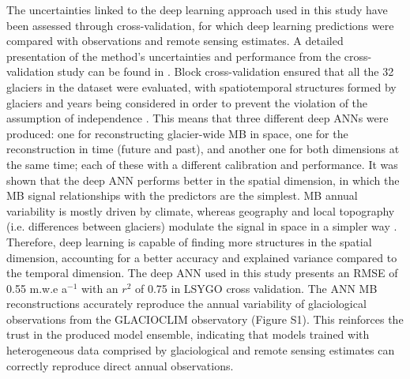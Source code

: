 {The uncertainties linked to the deep learning approach used in this study have been assessed through cross-validation, for which deep learning predictions were compared with observations and remote sensing estimates. A detailed presentation of the method's uncertainties and performance from the cross-validation study can be found in \citet{bolibar_deep_2020-1}. Block cross-validation ensured that all the 32 glaciers in the dataset were evaluated, with spatiotemporal structures formed by glaciers and years being considered in order to prevent the violation of the assumption of independence \citep{roberts_cross-validation_2017}. This means that three different deep ANNs were produced: one for reconstructing glacier-wide MB in space, one for the reconstruction in time (future and past), and another one for both dimensions at the same time; each of these with a different calibration and performance. It was shown that the deep ANN performs better in the spatial dimension, in which the MB signal relationships with the predictors are the simplest. MB annual variability is mostly driven by climate, whereas geography and local topography (i.e. differences between glaciers) modulate the signal in space in a simpler way \citep{vincent_common_2017, bolibar_deep_2020-1}. Therefore, deep learning is capable of finding more structures in the spatial dimension, accounting for a better accuracy and explained variance compared to the temporal dimension. The deep ANN used in this study presents an RMSE of 0.55 m.w.e a$^{-1}$ with an $r^{2}$ of 0.75 in LSYGO cross validation. The ANN MB reconstructions accurately reproduce the annual variability of glaciological observations from the GLACIOCLIM observatory (Figure S1). This reinforces the trust in the produced model ensemble, indicating that models trained with  heterogeneous data comprised by glaciological and remote sensing estimates can correctly reproduce direct annual observations.  

}
